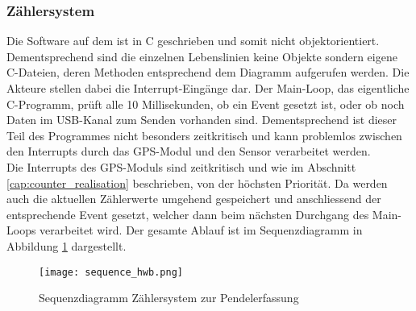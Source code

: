 	\subsubsection{Zählersystem}
	Die Software auf dem \hwb ist in C geschrieben und somit nicht objektorientiert. Dementsprechend sind die einzelnen Lebenslinien keine Objekte sondern eigene C-Dateien, deren Methoden entsprechend dem Diagramm aufgerufen werden. Die Akteure stellen dabei die Interrupt-Eingänge dar.
	\noindent Der Main-Loop, das eigentliche C-Programm, prüft alle 10 Millisekunden, ob ein Event gesetzt ist, oder ob noch Daten im USB-Kanal zum Senden vorhanden sind. Dementsprechend ist dieser Teil des Programmes nicht besonders zeitkritisch und kann problemlos zwischen den Interrupts durch das GPS-Modul und den Sensor verarbeitet werden.\\
	Die Interrupts des GPS-Moduls sind zeitkritisch und wie im Abschnitt \ref{cap:counter_realisation} beschrieben, von der höchsten Priorität. Da werden auch die aktuellen Zählerwerte umgehend gespeichert und anschliessend der entsprechende Event gesetzt, welcher dann beim nächsten Durchgang des Main-Loops verarbeitet wird. Der gesamte Ablauf ist im Sequenzdiagramm in Abbildung \ref{fig:sequence_hwb} dargestellt.
 	\begin{figure}[H]
   		\centering
        \texttt{[image: sequence\_hwb.png]}
        \caption{Sequenzdiagramm Zählersystem zur Pendelerfassung}
        \label{fig:sequence_hwb}
    \end{figure}